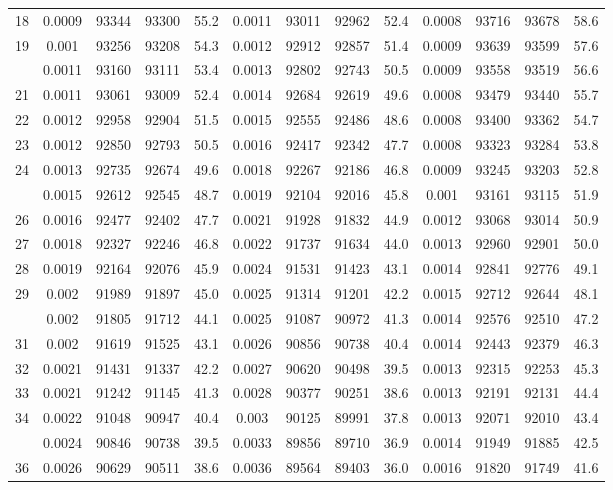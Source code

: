 \documentclass[
  14pt,
]{article}
\begin{document}
\begin{longtable}[t]{lcccccccccccc}
18 & 0.0009 & 93344 & 93300 & 55.2 & 0.0011 & 93011 & 92962 & 52.4 & 0.0008 & 93716 & 93678 & 58.6\\
19 & 0.001 & 93256 & 93208 & 54.3 & 0.0012 & 92912 & 92857 & 51.4 & 0.0009 & 93639 & 93599 & 57.6\\
\addlinespace
20 & 0.0011 & 93160 & 93111 & 53.4 & 0.0013 & 92802 & 92743 & 50.5 & 0.0009 & 93558 & 93519 & 56.6\\
21 & 0.0011 & 93061 & 93009 & 52.4 & 0.0014 & 92684 & 92619 & 49.6 & 0.0008 & 93479 & 93440 & 55.7\\
22 & 0.0012 & 92958 & 92904 & 51.5 & 0.0015 & 92555 & 92486 & 48.6 & 0.0008 & 93400 & 93362 & 54.7\\
23 & 0.0012 & 92850 & 92793 & 50.5 & 0.0016 & 92417 & 92342 & 47.7 & 0.0008 & 93323 & 93284 & 53.8\\
24 & 0.0013 & 92735 & 92674 & 49.6 & 0.0018 & 92267 & 92186 & 46.8 & 0.0009 & 93245 & 93203 & 52.8\\
\addlinespace
25 & 0.0015 & 92612 & 92545 & 48.7 & 0.0019 & 92104 & 92016 & 45.8 & 0.001 & 93161 & 93115 & 51.9\\
26 & 0.0016 & 92477 & 92402 & 47.7 & 0.0021 & 91928 & 91832 & 44.9 & 0.0012 & 93068 & 93014 & 50.9\\
27 & 0.0018 & 92327 & 92246 & 46.8 & 0.0022 & 91737 & 91634 & 44.0 & 0.0013 & 92960 & 92901 & 50.0\\
28 & 0.0019 & 92164 & 92076 & 45.9 & 0.0024 & 91531 & 91423 & 43.1 & 0.0014 & 92841 & 92776 & 49.1\\
29 & 0.002 & 91989 & 91897 & 45.0 & 0.0025 & 91314 & 91201 & 42.2 & 0.0015 & 92712 & 92644 & 48.1\\
\addlinespace
30 & 0.002 & 91805 & 91712 & 44.1 & 0.0025 & 91087 & 90972 & 41.3 & 0.0014 & 92576 & 92510 & 47.2\\
31 & 0.002 & 91619 & 91525 & 43.1 & 0.0026 & 90856 & 90738 & 40.4 & 0.0014 & 92443 & 92379 & 46.3\\
32 & 0.0021 & 91431 & 91337 & 42.2 & 0.0027 & 90620 & 90498 & 39.5 & 0.0013 & 92315 & 92253 & 45.3\\
33 & 0.0021 & 91242 & 91145 & 41.3 & 0.0028 & 90377 & 90251 & 38.6 & 0.0013 & 92191 & 92131 & 44.4\\
34 & 0.0022 & 91048 & 90947 & 40.4 & 0.003 & 90125 & 89991 & 37.8 & 0.0013 & 92071 & 92010 & 43.4\\
\addlinespace
35 & 0.0024 & 90846 & 90738 & 39.5 & 0.0033 & 89856 & 89710 & 36.9 & 0.0014 & 91949 & 91885 & 42.5\\
36 & 0.0026 & 90629 & 90511 & 38.6 & 0.0036 & 89564 & 89403 & 36.0 & 0.0016 & 91820 & 91749 & 41.6\\

\end{longtable}
\end{document}
